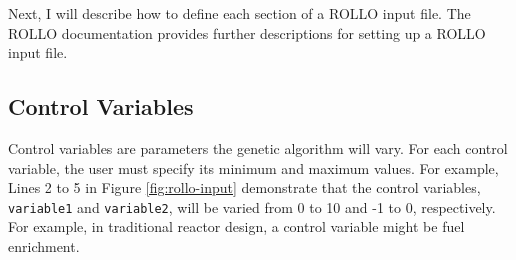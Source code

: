Next, I will describe how to define each section of a \gls{ROLLO} input file. 
The \gls{ROLLO} documentation \cite{chee_documentation_2021} provides further 
descriptions for setting up a \gls{ROLLO} input file.

\subsection{Control Variables}
Control variables are parameters the genetic algorithm will vary. 
For each control variable, the user must specify its minimum and maximum values.
For example, Lines 2 to 5 in Figure \ref{fig:rollo-input} demonstrate that the 
control variables, \texttt{variable1} and \texttt{variable2}, 
will be varied from 0 to 10 and -1 to 0, respectively. 
For example, in traditional reactor design, a control variable might be fuel 
enrichment. 


